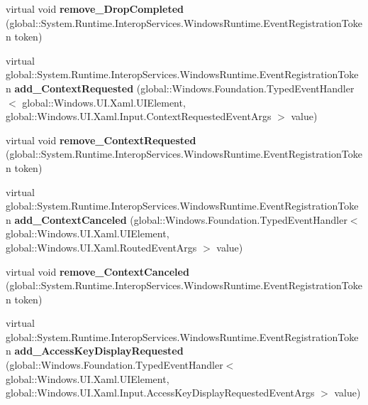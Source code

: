 \begin{DoxyCompactItemize}
\item 
\mbox{\label{class_windows_1_1_u_i_1_1_xaml_1_1_u_i_element_a175ef186f4de5c6a422a88d8f42588e3}} 
virtual void {\bfseries remove\+\_\+\+Drop\+Completed} (global\+::\+System.\+Runtime.\+Interop\+Services.\+Windows\+Runtime.\+Event\+Registration\+Token token)
\item 
\mbox{\label{class_windows_1_1_u_i_1_1_xaml_1_1_u_i_element_af82e90640323c9da8621013a558c87f1}} 
virtual global\+::\+System.\+Runtime.\+Interop\+Services.\+Windows\+Runtime.\+Event\+Registration\+Token {\bfseries add\+\_\+\+Context\+Requested} (global\+::\+Windows.\+Foundation.\+Typed\+Event\+Handler$<$ global\+::\+Windows.\+U\+I.\+Xaml.\+U\+I\+Element, global\+::\+Windows.\+U\+I.\+Xaml.\+Input.\+Context\+Requested\+Event\+Args $>$ value)
\item 
\mbox{\label{class_windows_1_1_u_i_1_1_xaml_1_1_u_i_element_a41e65f1fea8389643eabe21d9861a727}} 
virtual void {\bfseries remove\+\_\+\+Context\+Requested} (global\+::\+System.\+Runtime.\+Interop\+Services.\+Windows\+Runtime.\+Event\+Registration\+Token token)
\item 
\mbox{\label{class_windows_1_1_u_i_1_1_xaml_1_1_u_i_element_a10d84028f6f428f4a5c1fe8fe9501deb}} 
virtual global\+::\+System.\+Runtime.\+Interop\+Services.\+Windows\+Runtime.\+Event\+Registration\+Token {\bfseries add\+\_\+\+Context\+Canceled} (global\+::\+Windows.\+Foundation.\+Typed\+Event\+Handler$<$ global\+::\+Windows.\+U\+I.\+Xaml.\+U\+I\+Element, global\+::\+Windows.\+U\+I.\+Xaml.\+Routed\+Event\+Args $>$ value)
\item 
\mbox{\label{class_windows_1_1_u_i_1_1_xaml_1_1_u_i_element_a62c78b7595f4771d8fae8188641db45e}} 
virtual void {\bfseries remove\+\_\+\+Context\+Canceled} (global\+::\+System.\+Runtime.\+Interop\+Services.\+Windows\+Runtime.\+Event\+Registration\+Token token)
\item 
\mbox{\label{class_windows_1_1_u_i_1_1_xaml_1_1_u_i_element_a33aadbdcdc9a08239adba0ea7ca3dc2c}} 
virtual global\+::\+System.\+Runtime.\+Interop\+Services.\+Windows\+Runtime.\+Event\+Registration\+Token {\bfseries add\+\_\+\+Access\+Key\+Display\+Requested} (global\+::\+Windows.\+Foundation.\+Typed\+Event\+Handler$<$ global\+::\+Windows.\+U\+I.\+Xaml.\+U\+I\+Element, global\+::\+Windows.\+U\+I.\+Xaml.\+Input.\+Access\+Key\+Display\+Requested\+Event\+Args $>$ value)

\end{DoxyCompactItemize}
